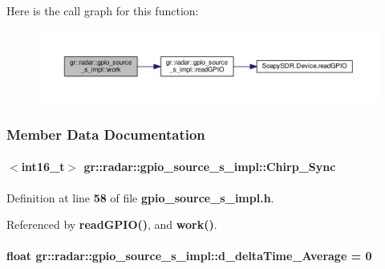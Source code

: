 Here is the call graph for this function\+:
\nopagebreak
\begin{figure}[H]
\begin{center}
\leavevmode
\includegraphics[width=350pt]{da/d97/classgr_1_1radar_1_1gpio__source__s__impl_ac5b36b540ac5aec53df8fac626051c7a_cgraph}
\end{center}
\end{figure}




\subsubsection{Member Data Documentation}
\paragraph[{Chirp\+\_\+\+Sync}]{$<$int16\+\_\+t$>$ gr\+::radar\+::gpio\+\_\+source\+\_\+s\+\_\+impl\+::\+Chirp\+\_\+\+Sync\hspace{0.3cm}{\ttfamily [private]}}\label{classgr_1_1radar_1_1gpio__source__s__impl_a13abd157c1281b5a69a52db410088627}


Definition at line {\bf 58} of file {\bf gpio\+\_\+source\+\_\+s\+\_\+impl.\+h}.



Referenced by {\bf read\+G\+P\+I\+O()}, and {\bf work()}.

\paragraph[{d\+\_\+delta\+Time\+\_\+\+Average}]{\setlength{\rightskip}{0pt plus 5cm}float gr\+::radar\+::gpio\+\_\+source\+\_\+s\+\_\+impl\+::d\+\_\+delta\+Time\+\_\+\+Average = 0\hspace{0.3cm}{\ttfamily [private]}}\label{classgr_1_1radar_1_1gpio__source__s__impl_ad49f4b919fe86c68bc3b04f329c6d37d}


